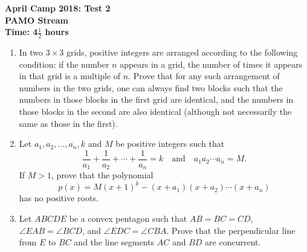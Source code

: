 \documentclass[a4paper,12pt]{article}
\begin{document}
\setcounter{page}{1}

\begin{center}
	\textbf{April Camp 2018: Test 2}\\
	\textbf{PAMO Stream}\\
	\textbf{Time: 4$\frac{1}{2}$ hours}
\end{center}

\begin{enumerate}
\vspace{0.2cm}

\item %
In two $3\times 3$ grids, positive integers are arranged according to the following condition: if the number $n$ appears in a grid, the number of times it appears in that grid is a multiple of $n$. Prove that for any such arrangement of numbers in the two grids, one can always find two blocks such that the numbers in those blocks in the first grid are identical, and the numbers in those blocks in the second are also identical (although not necessarily the same as those in the first).   

\item %
Let $a_1, a_2, \dotsc, a_n, k$ and $M$ be positive integers such that \[ \frac{1}{a_1} +\frac{1}{a_2} +\dotsb +\frac{1}{a_n} = k \quad\textrm{and}\quad a_1a_2\dotsb a_n = M.\]
If $M > 1$, prove that the polynomial \[p(x) = M(x+1)^k - (x+a_1)(x+a_2)\dotsb(x+a_n)\] has no positive roots.

\item %
Let $ABCDE$ be a convex pentagon such that $AB = BC = CD$, $\angle EAB =\angle BCD$, and $\angle EDC =\angle CBA$. Prove that the perpendicular line from $E$ to $BC$ and the line segments $AC$ and $BD$ are concurrent.


\end{enumerate}
\end{document}
